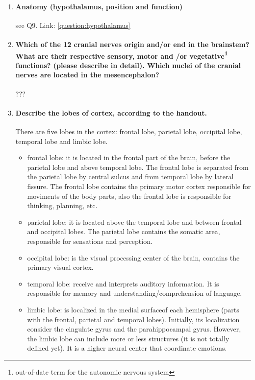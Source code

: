 \documentclass[12pt,article,oneside,a4paper]{memoir}
\begin{document}
\begin{enumerate}
\item \paragraph{Anatomy (hypothalamus, position and function)}
see Q9. Link: \ref{question:hypothalamus}

\item \paragraph{Which of the 12 cranial nerves origin and/or end in the brainstem? What are their respective sensory, motor and /or vegetative\protect\footnote{out-of-date term for the autonomic nervous system} functions? (please describe in detail). Which nuclei of the cranial nerves are located in the mesencephalon?}
???

\item \paragraph{Describe the lobes of cortex, according to the handout.} 
There are five lobes in the cortex: frontal lobe, parietal lobe, occipital lobe, temporal lobe and limbic lobe.
\begin{itemize}
\item frontal lobe: it is located in the frontal part of the brain, before the parietal lobe and above temporal lobe. The frontal lobe is separated from the parietal lobe by central sulcus and from temporal lobe by lateral fissure. The frontal lobe contains the primary motor cortex responsible for moviments of the body parts, also the frontal lobe is responsible for thinking, planning, etc.
\item parietal lobe: it is located above the temporal lobe and between frontal and occipital lobes. The parietal lobe contains the somatic area, responsible for sensations and perception.
\item occipital lobe: is the visual processing center of the brain, contains the primary visual cortex.
\item temporal lobe: receive and interprets auditory information. It is responsible for memory and understanding/comprehension of language.
\item limbic lobe: is localized in the medial surfaceof each hemisphere (parts with the frontal, parietal and temporal lobes). Initially, its localization consider the cingulate gyrus and the parahippocampal gyrus. However, the limbic lobe can include more or less structures (it is not totally defined yet). It is a higher neural center that coordinate emotions.
\end{itemize}


\end{enumerate}
\end{document}
